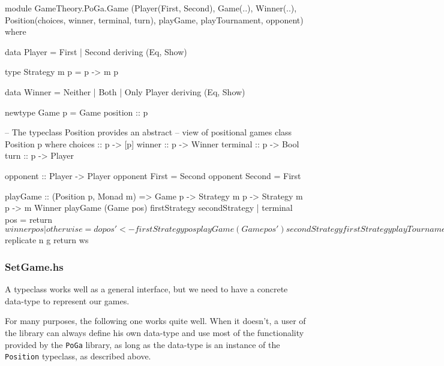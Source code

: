 \begin{code}
module GameTheory.PoGa.Game
       (Player(First, Second),
        Game(..),
        Winner(..),
        Position(choices, winner, terminal, turn),
        playGame,
        playTournament,
        opponent)
        where

data Player = First | Second
  deriving (Eq, Show)
           
type Strategy m p = p -> m p

data Winner = Neither | Both | Only Player
  deriving (Eq, Show)

newtype Game p = Game {position :: p}

-- The typeclass Position provides an abstract
-- view of positional games
class Position p where
  choices :: p -> [p]
  winner :: p -> Winner
  terminal :: p -> Bool
  turn :: p -> Player

opponent :: Player -> Player
opponent First = Second
opponent Second = First

playGame :: (Position p, Monad m) =>
            Game p -> Strategy m p -> Strategy m p -> m Winner
playGame (Game pos) firstStrategy secondStrategy
  | terminal pos = return $ winner pos
  | otherwise = do
      pos' <- firstStrategy pos
      playGame (Game pos') secondStrategy firstStrategy
      
playTournament :: (Monad m, Position p) =>
                  Int -> Game p -> Strategy m p -> Strategy m p -> m [Winner]
playTournament n game fststrat sndstrat = do
  let g = playGame game fststrat sndstrat
  ws <- sequence $ replicate n g
  return ws
\end{code}

\subsubsection{SetGame.hs}

A typeclass works well as a general interface, but we need to have a concrete data-type to represent our games.

For many purposes, the following one works quite well. When it doesn't, a user of the library can always define his own data-type and use most of the functionality provided by the \texttt{PoGa} library, as long as the data-type is an instance of the \texttt{Position} typeclass, as described above.

